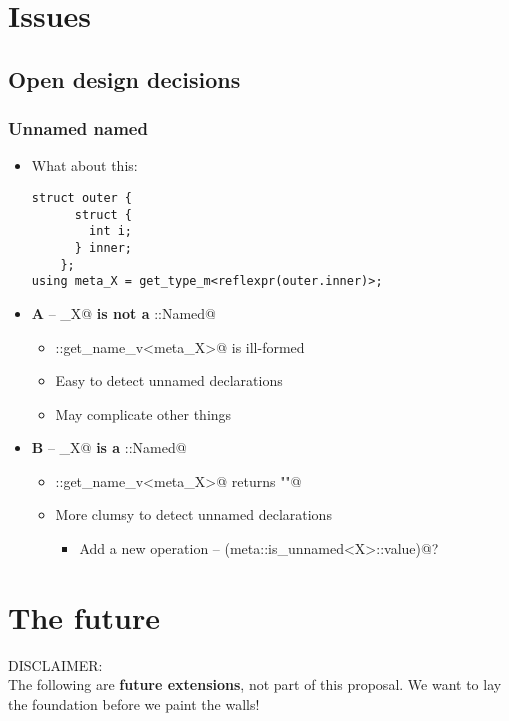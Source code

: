 \documentclass[compress,table,xcolor=table]{beamer}
\begin{document}
\section{Issues}

\subsection{Open design decisions}
\begin{frame}[fragile]
\frametitle{Unnamed named}
  \begin{itemize}
    \item What about this:
    \begin{lstlisting}[basicstyle=\footnotesize\ttfamily]
	struct outer {
	  struct {
	    int i;
	  } inner;
	};
using meta_X = get_type_m<reflexpr(outer.inner)>;
    \end{lstlisting}
    \item {\bf A} -- \verb@meta_X@ \textbf{is not a} \verb@meta::Named@
    \begin{itemize}
      \small
      \item \verb@meta::get_name_v<meta_X>@ is ill-formed
      \item Easy to detect unnamed declarations
      \item May complicate other things
    \end{itemize}
    \item {\bf B} -- \verb@meta_X@ \textbf{is a} \verb@meta::Named@
    \begin{itemize}
      \small
      \item \verb@meta::get_name_v<meta_X>@ returns \verb@""@
      \item More clumsy to detect unnamed declarations
      \begin{itemize}
        \item Add a new operation -- \verb@bool(meta::is_unnamed<X>::value)@?
      \end{itemize}
    \end{itemize}
  \end{itemize}
\end{frame}

\section{The future}

\begin{frame}
\begin{center}
\Huge \alert{DISCLAIMER:}\\
\Large The following are \textbf{future extensions}, not part of this
proposal. We want to lay the foundation before we paint the walls!\\
\normalsize
\end{center}
\end{frame}
\end{document}
